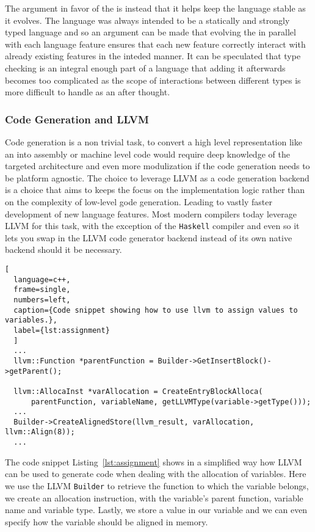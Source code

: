 The argument in favor of the \typeChecker{} is instead that it helps keep the
language stable as it evolves. The language was always intended to be a statically
and strongly typed language and so an argument can be made that evolving the
\typeChecker{} in parallel with each language feature ensures that each new feature
correctly interact with already existing features in the inteded manner. It can be
speculated that type checking is an integral enough part of a language that adding it
afterwards becomes too complicated as the scope of interactions between different
types is more difficult to handle as an after thought. \\ 

\subsubsection{Code Generation and LLVM}

Code generation is a non trivial task, to convert a high level representation like an
\ast{} into assembly or machine level code would require deep knowledge of the targeted
architecture and even more modulization if the code generation needs to be platform
agnostic. The choice to leverage LLVM as a code generation backend is a choice that
aims to keeps the focus on the implementation logic rather than on
the complexity of low-level gode generation. Leading to vastly faster development of
new language features. Most modern compilers today leverage LLVM for this task, with
the exception of the \texttt{Haskell} compiler and even so it lets you swap in the
LLVM code generator backend instead of its own native backend should it be necessary.

\begin{lstlisting}[
  language=c++,
  frame=single,
  numbers=left,
  caption={Code snippet showing how to use llvm to assign values to variables.},
  label={lst:assignment}
  ]
  ...
  llvm::Function *parentFunction = Builder->GetInsertBlock()->getParent();

  llvm::AllocaInst *varAllocation = CreateEntryBlockAlloca(
      parentFunction, variableName, getLLVMType(variable->getType()));
  ...
  Builder->CreateAlignedStore(llvm_result, varAllocation, llvm::Align(8));
  ...
\end{lstlisting}

The code snippet Listing~\ref{lst:assignment} shows in a simplified way how LLVM can
be used to generate code when dealing with the allocation of variables.
Here we use the LLVM \texttt{Builder} to retrieve the function to which the variable
belongs, we create an allocation instruction, with the variable's parent function,
variable name and variable type. Lastly, we store a value in our variable and we can
even specify how the variable should be aligned in memory.\\

